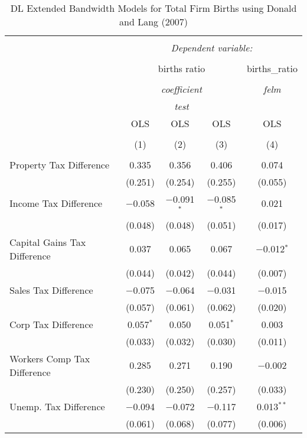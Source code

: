 
\begin{table}[!htbp] \centering 
  \caption{DL Extended Bandwidth Models for  Total Firm Births using Donald and Lang (2007)} 
  \label{} 
\begin{tabular}{@{\extracolsep{5pt}}lcccc} 
\\[-1.8ex]\hline 
\hline \\[-1.8ex] 
 & \multicolumn{4}{c}{\textit{Dependent variable:}} \\ 
\cline{2-5} 
\\[-1.8ex] & \multicolumn{3}{c}{births ratio} & births\_ratio \\ 
\\[-1.8ex] & \multicolumn{3}{c}{\textit{coefficient}} & \textit{felm} \\ 
 & \multicolumn{3}{c}{\textit{test}} & \textit{} \\ 
 & OLS & OLS & OLS & OLS \\ 
\\[-1.8ex] & (1) & (2) & (3) & (4)\\ 
\hline \\[-1.8ex] 
 Property Tax Difference & 0.335 & 0.356 & 0.406 & 0.074 \\ 
  & (0.251) & (0.254) & (0.255) & (0.055) \\ 
  Income Tax Difference & $-$0.058 & $-$0.091$^{*}$ & $-$0.085$^{*}$ & 0.021 \\ 
  & (0.048) & (0.048) & (0.051) & (0.017) \\ 
  Capital Gains Tax Difference & 0.037 & 0.065 & 0.067 & $-$0.012$^{*}$ \\ 
  & (0.044) & (0.042) & (0.044) & (0.007) \\ 
  Sales Tax Difference & $-$0.075 & $-$0.064 & $-$0.031 & $-$0.015 \\ 
  & (0.057) & (0.061) & (0.062) & (0.020) \\ 
  Corp Tax Difference & 0.057$^{*}$ & 0.050 & 0.051$^{*}$ & 0.003 \\ 
  & (0.033) & (0.032) & (0.030) & (0.011) \\ 
  Workers Comp Tax Difference & 0.285 & 0.271 & 0.190 & $-$0.002 \\ 
  & (0.230) & (0.250) & (0.257) & (0.033) \\ 
  Unemp. Tax Difference & $-$0.094 & $-$0.072 & $-$0.117 & 0.013$^{**}$ \\ 
  & (0.061) & (0.068) & (0.077) & (0.006) \\ 

\end{tabular}
\end{table}
